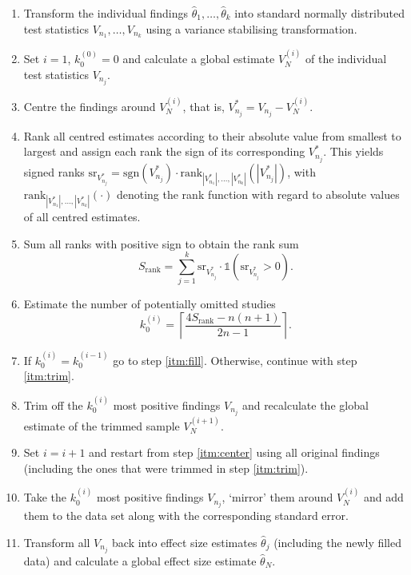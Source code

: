 \begin{enumerate}
    \item \label{itm:transform} Transform the individual findings $\hat{\theta}_{1},\dots,\hat{\theta}_{k}$ into standard normally distributed test statistics ${V_{n_1}, \dots, V_{n_k}}$ using a variance stabilising transformation.
    \item \label{itm:global_estimate_init} Set $i=1$, $k_0^{(0)}=0$ and calculate a global estimate $V_N^{(i)}$ of the individual test statistics $V_{n_j}$.
    \item \label{itm:center} Centre the findings around $V_N^{(i)}$, that is, $V_{n_j}^{*} = V_{n_j} - V_N^{(i)}$.
    \item Rank all centred estimates according to their absolute value from smallest to largest and assign each rank the sign of its corresponding $V_{n_j}^{*}$. This yields signed ranks $\text{sr}_{V_{n_j}^{*}} = \text{sgn}(V_{n_j}^{*})\cdot\text{rank}_{|V_{n_1}^{*}|,\dots,|V_{n_k}^{*}|}(|V_{n_j}^{*}|)$, with $\text{rank}_{|V_{n_1}^{*}|,\dots,|V_{n_k}^{*}|}(\cdot)$ denoting the rank function with regard to absolute values of all centred estimates.
    \item Sum all ranks with positive sign to obtain the rank sum $$S_{\text{rank}} = \sum_{j=1}^k  \text{sr}_{V_{n_j}^{*}}\cdot \mathbb{1}(\text{sr}_{V_{n_j}^{*}} > 0).$$
    \item Estimate the number of potentially omitted studies $$k_0^{(i)} = \left\lceil\frac{4 S_{\text{rank}}-n(n+1)}{2n-1}\right\rceil.$$
    \item If ${k_0^{(i)} = k_0^{(i-1)}}$ go to step \ref{itm:fill}. Otherwise, continue with step \ref{itm:trim}. 
    \item \label{itm:trim} Trim off the $k_0^{(i)}$ most positive findings $V_{n_j}$ and recalculate the global estimate of the trimmed sample $V_N^{(i+1)}$.
    \item Set $i = i+1$ and restart from step \ref{itm:center} using all original findings (including the ones that were trimmed in step \ref{itm:trim}).
    \item \label{itm:fill} Take the $k_0^{(i)}$ most positive findings $V_{n_j}$, `mirror' them around $V_N^{(i)}$ and add them to the data set along with the corresponding standard error.
    \item Transform all $V_{n_j}$ back into effect size estimates $\hat{\theta}_j$ (including the newly filled data) and calculate a global effect size estimate $\hat{\theta}_{N}$.
\end{enumerate}

